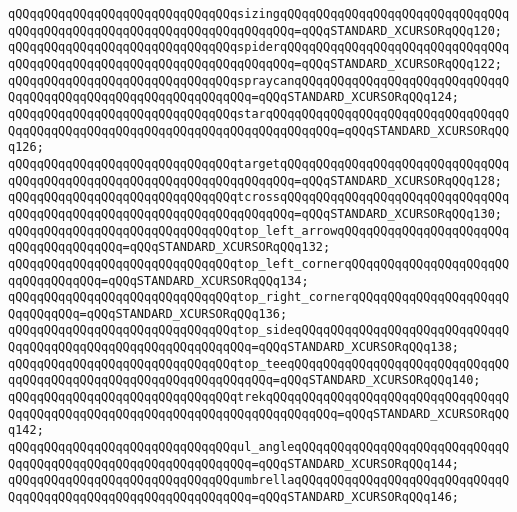 \verb|qQQqqQQqqQQqqQQqqQQqqQQqqQQqqQQqsizingqQQqqQQqqQQqqQQqqQQqqQQqqQQqqQQqqQQqqQQqqQQqqQQqqQQqqQQqqQQqqQQqqQQqqQQq=qQQqSTANDARD_XCURSORqQQq120;|\newline
\verb|qQQqqQQqqQQqqQQqqQQqqQQqqQQqqQQqspiderqQQqqQQqqQQqqQQqqQQqqQQqqQQqqQQqqQQqqQQqqQQqqQQqqQQqqQQqqQQqqQQqqQQqqQQq=qQQqSTANDARD_XCURSORqQQq122;|\newline
\verb|qQQqqQQqqQQqqQQqqQQqqQQqqQQqqQQqspraycanqQQqqQQqqQQqqQQqqQQqqQQqqQQqqQQqqQQqqQQqqQQqqQQqqQQqqQQqqQQqqQQq=qQQqSTANDARD_XCURSORqQQq124;|\newline
\verb|qQQqqQQqqQQqqQQqqQQqqQQqqQQqqQQqstarqQQqqQQqqQQqqQQqqQQqqQQqqQQqqQQqqQQqqQQqqQQqqQQqqQQqqQQqqQQqqQQqqQQqqQQqqQQqqQQq=qQQqSTANDARD_XCURSORqQQq126;|\newline
\verb|qQQqqQQqqQQqqQQqqQQqqQQqqQQqqQQqtargetqQQqqQQqqQQqqQQqqQQqqQQqqQQqqQQqqQQqqQQqqQQqqQQqqQQqqQQqqQQqqQQqqQQqqQQq=qQQqSTANDARD_XCURSORqQQq128;|\newline
\verb|qQQqqQQqqQQqqQQqqQQqqQQqqQQqqQQqtcrossqQQqqQQqqQQqqQQqqQQqqQQqqQQqqQQqqQQqqQQqqQQqqQQqqQQqqQQqqQQqqQQqqQQqqQQq=qQQqSTANDARD_XCURSORqQQq130;|\newline
\verb|qQQqqQQqqQQqqQQqqQQqqQQqqQQqqQQqtop_left_arrowqQQqqQQqqQQqqQQqqQQqqQQqqQQqqQQqqQQqqQQq=qQQqSTANDARD_XCURSORqQQq132;|\newline
\verb|qQQqqQQqqQQqqQQqqQQqqQQqqQQqqQQqtop_left_cornerqQQqqQQqqQQqqQQqqQQqqQQqqQQqqQQqqQQq=qQQqSTANDARD_XCURSORqQQq134;|\newline
\verb|qQQqqQQqqQQqqQQqqQQqqQQqqQQqqQQqtop_right_cornerqQQqqQQqqQQqqQQqqQQqqQQqqQQqqQQq=qQQqSTANDARD_XCURSORqQQq136;|\newline
\verb|qQQqqQQqqQQqqQQqqQQqqQQqqQQqqQQqtop_sideqQQqqQQqqQQqqQQqqQQqqQQqqQQqqQQqqQQqqQQqqQQqqQQqqQQqqQQqqQQqqQQq=qQQqSTANDARD_XCURSORqQQq138;|\newline
\verb|qQQqqQQqqQQqqQQqqQQqqQQqqQQqqQQqtop_teeqQQqqQQqqQQqqQQqqQQqqQQqqQQqqQQqqQQqqQQqqQQqqQQqqQQqqQQqqQQqqQQqqQQq=qQQqSTANDARD_XCURSORqQQq140;|\newline
\verb|qQQqqQQqqQQqqQQqqQQqqQQqqQQqqQQqtrekqQQqqQQqqQQqqQQqqQQqqQQqqQQqqQQqqQQqqQQqqQQqqQQqqQQqqQQqqQQqqQQqqQQqqQQqqQQqqQQq=qQQqSTANDARD_XCURSORqQQq142;|\newline
\verb|qQQqqQQqqQQqqQQqqQQqqQQqqQQqqQQqul_angleqQQqqQQqqQQqqQQqqQQqqQQqqQQqqQQqqQQqqQQqqQQqqQQqqQQqqQQqqQQqqQQq=qQQqSTANDARD_XCURSORqQQq144;|\newline
\verb|qQQqqQQqqQQqqQQqqQQqqQQqqQQqqQQqumbrellaqQQqqQQqqQQqqQQqqQQqqQQqqQQqqQQqqQQqqQQqqQQqqQQqqQQqqQQqqQQqqQQq=qQQqSTANDARD_XCURSORqQQq146;|\newline
